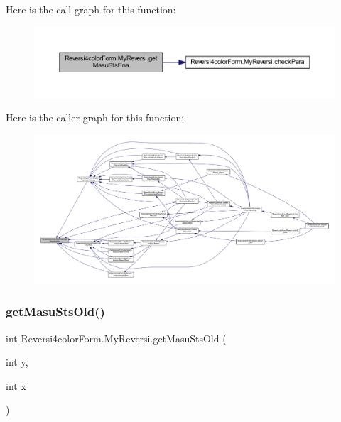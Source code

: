 Here is the call graph for this function\+:\nopagebreak
\begin{figure}[H]
\begin{center}
\leavevmode
\includegraphics[width=350pt]{class_reversi4color_form_1_1_my_reversi_ac17f7f56dd24fa06ac8d394290feafef_cgraph}
\end{center}
\end{figure}
Here is the caller graph for this function\+:\nopagebreak
\begin{figure}[H]
\begin{center}
\leavevmode
\includegraphics[width=350pt]{class_reversi4color_form_1_1_my_reversi_ac17f7f56dd24fa06ac8d394290feafef_icgraph}
\end{center}
\end{figure}
\mbox{\label{class_reversi4color_form_1_1_my_reversi_aa56088eff96a48e68d4c7f688fe06b8d}} 
\subsubsection{\texorpdfstring{get\+Masu\+Sts\+Old()}{getMasuStsOld()}}
{\footnotesize\ttfamily int Reversi4color\+Form.\+My\+Reversi.\+get\+Masu\+Sts\+Old (\begin{DoxyParamCaption}\item[{int}]{y,  }\item[{int}]{x }\end{DoxyParamCaption})}



